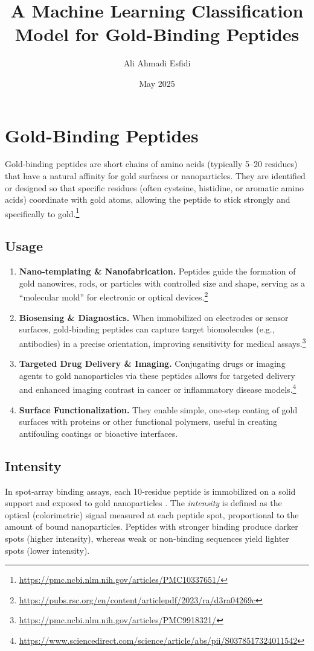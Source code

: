 \documentclass{article}
\title{A Machine Learning Classification Model for Gold-Binding Peptides}
\author{Ali Ahmadi Esfidi}
\date{May 2025}
\begin{document}
\maketitle

\section{Gold-Binding Peptides}
Gold‐binding peptides are short chains of amino acids (typically 5–20 residues) that have a natural affinity for gold surfaces or nanoparticles. They are identified or designed so that specific residues (often cysteine, histidine, or aromatic amino acids) coordinate with gold atoms, allowing the peptide to stick strongly and specifically to gold.\footnote{\url{https://pmc.ncbi.nlm.nih.gov/articles/PMC10337651/}}

\subsection{Usage}
\begin{enumerate}
  \item \textbf{Nano‐templating \& Nanofabrication.} Peptides guide the formation of gold nanowires, rods, or particles with controlled size and shape, serving as a “molecular mold” for electronic or optical devices.\footnote{\url{https://pubs.rsc.org/en/content/articlepdf/2023/ra/d3ra04269c}}
  \item \textbf{Biosensing \& Diagnostics.} When immobilized on electrodes or sensor surfaces, gold‐binding peptides can capture target biomolecules (e.g., antibodies) in a precise orientation, improving sensitivity for medical assays.\footnote{\url{https://pmc.ncbi.nlm.nih.gov/articles/PMC9918321/}}
  \item \textbf{Targeted Drug Delivery \& Imaging.} Conjugating drugs or imaging agents to gold nanoparticles via these peptides allows for targeted delivery and enhanced imaging contrast in cancer or inflammatory disease models.\footnote{\url{https://www.sciencedirect.com/science/article/abs/pii/S0378517324011542}}
  \item \textbf{Surface Functionalization.} They enable simple, one‐step coating of gold surfaces with proteins or other functional polymers, useful in creating antifouling coatings or bioactive interfaces.
\end{enumerate}

\subsection{Intensity}
In spot‐array binding assays, each 10‐residue peptide is immobilized on a solid support and exposed to gold nanoparticles \cite{tanaka2017}. The \emph{intensity} is defined as the optical (colorimetric) signal measured at each peptide spot, proportional to the amount of bound nanoparticles. Peptides with stronger binding produce darker spots (higher intensity), whereas weak or non‐binding sequences yield lighter spots (lower intensity).
\end{document}
